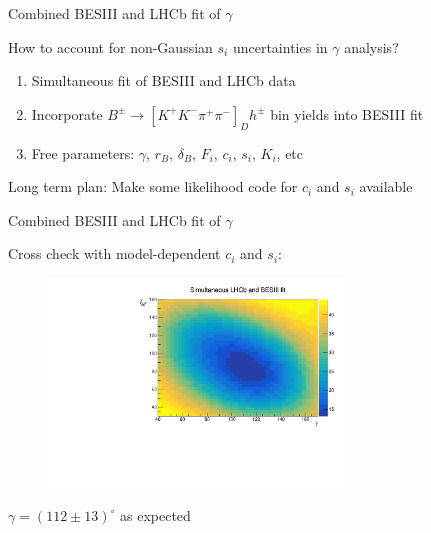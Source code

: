 \documentclass{beamer}
\begin{document}
\begin{frame}{Combined BESIII and LHCb fit of $\gamma$}
  \begin{center}
    {\large How to account for non-Gaussian $s_i$ uncertainties in $\gamma$ analysis?}
  \end{center}
  \begin{enumerate}
    \setlength\itemsep{1.0em}
    \item{Simultaneous fit of BESIII and LHCb data}
    \item{Incorporate $B^\pm\to[K^+K^-\pi^+\pi^-]_Dh^\pm$ bin yields into BESIII fit}
    \item{Free parameters: $\gamma$, $r_B$, $\delta_B$, $F_i$, $c_i$, $s_i$, $K_i$, etc}
  \end{enumerate}
  \vspace{0.7cm}
  \begin{center}
    {\large Long term plan: Make some likelihood code for $c_i$ and $s_i$ available}
  \end{center}
\end{frame}

\begin{frame}{Combined BESIII and LHCb fit of $\gamma$}
  \begin{center}
    {\large Cross check with model-dependent $c_i$ and $s_i$:}
  \end{center}
  \begin{figure}
    \includegraphics[width=0.7\textwidth]{Plots/Contours_gamma_deltaB_ModelDependent_Scan.pdf}
  \end{figure}
  \begin{center}
    {\large $\gamma = (112 \pm 13)^\circ$ as expected}
  \end{center}
\end{frame}
\end{document}
